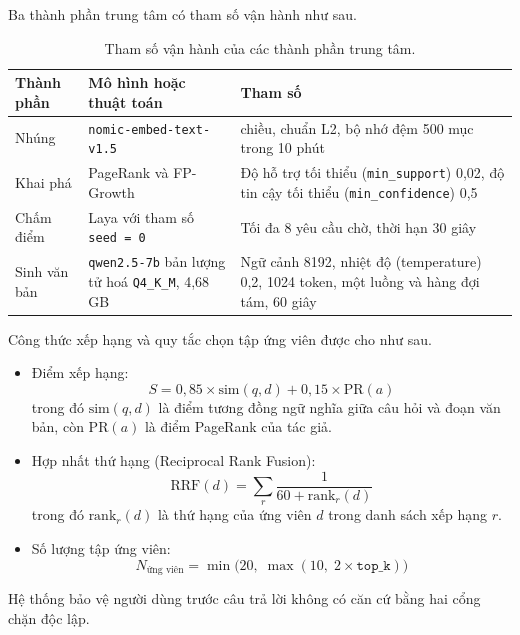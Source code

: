Ba thành phần trung tâm có tham số vận hành như sau.

\begin{table}[htbp]
    \centering
    \caption{Tham số vận hành của các thành phần trung tâm.}
    \label{tab:tham-so-thanh-phan}
    \small
    \begin{tabularx}{\textwidth}{@{}l>{\raggedright\arraybackslash}p{4.6cm}>{\raggedright\arraybackslash}X@{}}
        \toprule
        \textbf{Thành phần} & \textbf{Mô hình hoặc thuật toán} & \textbf{Tham số} \\
        \midrule
        Nhúng & \texttt{nomic-embed-text-v1.5} & 768 chiều, chuẩn L2, bộ nhớ đệm 500 mục trong 10 phút \\
        Khai phá & PageRank và FP-Growth & Độ hỗ trợ tối thiểu (\texttt{min\_support}) 0,02, độ tin cậy tối thiểu (\texttt{min\_confidence}) 0,5 \\
        Chấm điểm & Laya với tham số \texttt{seed = 0} & Tối đa 8 yêu cầu chờ, thời hạn 30 giây \\
        Sinh văn bản & \texttt{qwen2.5-7b} bản lượng tử hoá \texttt{Q4\_K\_M}, 4,68 GB & Ngữ cảnh 8192, nhiệt độ (temperature) 0,2, 1024 token, một luồng và hàng đợi tám, 60 giây \\
        \bottomrule
    \end{tabularx}
\end{table}

Công thức xếp hạng và quy tắc chọn tập ứng viên được cho như sau.

\begin{itemize}
    \item[--] Điểm xếp hạng:
    \[
        S = 0{,}85 \times \text{sim}(q, d) + 0{,}15 \times \text{PR}(a)
    \]
    trong đó $\text{sim}(q, d)$ là điểm tương đồng ngữ nghĩa giữa câu hỏi và đoạn văn bản, còn $\text{PR}(a)$ là điểm PageRank của tác giả.
    \item[--] Hợp nhất thứ hạng (Reciprocal Rank Fusion):
    \[
        \text{RRF}(d) = \sum_{r} \frac{1}{60 + \text{rank}_r(d)}
    \]
    trong đó $\text{rank}_r(d)$ là thứ hạng của ứng viên $d$ trong danh sách xếp hạng $r$.
    \item[--] Số lượng tập ứng viên:
    \[
        N_{\text{ứng viên}} = \min\bigl(20,\; \max(10,\; 2 \times \texttt{top\_k})\bigr)
    \]
\end{itemize}

Hệ thống bảo vệ người dùng trước câu trả lời không có căn cứ bằng hai cổng chặn độc lập.

